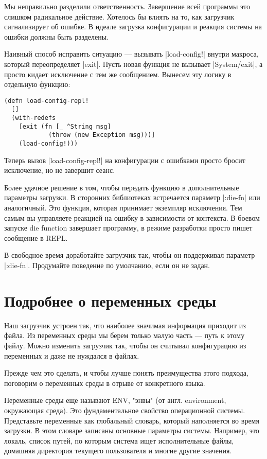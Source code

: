 Мы неправильно разделили ответственность. Завершение всей программы это слишком
радикальное действие. Хотелось бы влиять на то, как загрузчик сигнализирует об
ошибке. В идеале загрузка конфигурации и реакция системы на ошибки должны быть
разделены.

Наивный способ исправить ситуацию — вызывать \spverb|load-config!| внутри макроса,
который переопределяет \spverb|exit|. Пусть новая функция не вызывает \spverb|System/exit|, а
просто кидает исключение с тем же сообщением. Вынесем эту логику в отдельную
функцию:

\begin{verbatim}
(defn load-config-repl!
  []
  (with-redefs
    [exit (fn [_ ^String msg]
            (throw (new Exception msg)))]
    (load-config!)))
\end{verbatim}

Теперь вызов \spverb|load-config-repl!| на конфигурации с ошибками просто бросит
исключение, но не завершит сеанс.

Более удачное решение в том, чтобы передать функцию в дополнительные параметры
загрузки. В сторонних библиотеках встречается параметр \spverb|:die-fn| или
аналогичный. Это функция, которая принимает экземпляр исключения. Тем самым вы
управляете реакцией на ошибку в зависимости от контекста. В боевом запуске die
function завершает программу, в режиме разработки просто пишет сообщение в REPL.

В свободное время доработайте загрузчик так, чтобы он поддерживал параметр
\spverb|:die-fn|. Продумайте поведение по умолчанию, если он не задан.

\section{Подробнее о переменных среды}

Наш загрузчик устроен так, что наиболее значимая информация приходит из
файла. Из переменных среды мы берем только малую часть — путь к этому
файлу. Можно изменить загрузчик так, чтобы он считывал конфигурацию из
переменных и даже не нуждался в файлах.

Прежде чем это сделать, и чтобы лучше понять преимущества этого подхода,
поговорим о переменных среды в отрыве от конкретного языка.

Переменные среды еще называют ENV, "энвы" (от англ. environment, окружающая
среда). Это фундаментальное свойство операционной системы. Представьте
переменные как глобальный словарь, который наполняется во время загрузки. В этом
словаре записаны основные параметры системы. Например, это локаль, список путей,
по которым система ищет исполнительные файлы, домашняя директория текущего
пользователя и многие другие значения.

